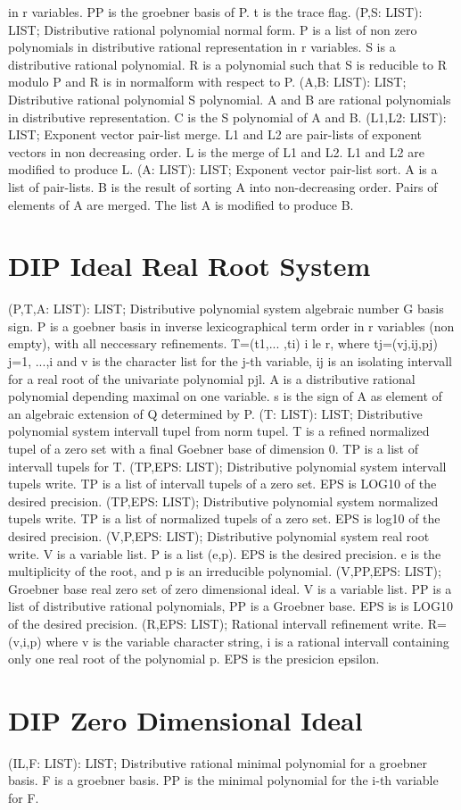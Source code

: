 in r variables. PP is the groebner basis of P. t is the
trace flag. \ecom 
{} (P,S: LIST): LIST; \eproc
\bcom Distributive rational polynomial normal form. P is a list
of non zero polynomials in distributive rational
representation in r variables. S is a distributive rational
polynomial. R is a polynomial such that S is reducible to R
modulo P and R is in normalform with respect to P.  \ecom 
{} (A,B: LIST): LIST; \eproc
\bcom Distributive rational polynomial S polynomial. A and B are
rational polynomials in distributive representation. C is
the S polynomial of A and B.  \ecom 
{} (L1,L2: LIST): LIST; \eproc
\bcom Exponent vector pair-list merge. L1 and L2 are pair-lists
of exponent vectors in non decreasing order.  L is the merge 
of L1 and L2. L1 and L2 are modified to produce L.  \ecom 
{} (A: LIST): LIST; \eproc
\bcom Exponent vector pair-list sort. A is a list of pair-lists. B is
the result of sorting A into non-decreasing order. Pairs of
elements of A are merged. The list A is modified to produce B.  \ecom 
\section{ DIP Ideal Real Root System  } 
 (P,T,A: LIST): LIST; \eproc
\bcom Distributive polynomial system algebraic number G basis sign.
P is a goebner basis in inverse lexicographical term order
in r variables (non empty), with all neccessary refinements.
T=(t1,... ,ti) i le r, where tj=(vj,ij,pj) j=1, ...,i and v is 
the character list for the j-th variable, ij is an isolating 
intervall for a real root of the univariate polynomial pjl.
A is a distributive rational polynomial depending maximal on one 
variable. s is the sign of A as element of an algebraic extension
of Q determined by P.  \ecom 
{} (T: LIST): LIST; \eproc
\bcom Distributive polynomial system intervall tupel from norm tupel.
T is a refined normalized tupel of a zero set with a final Goebner 
base of dimension 0. TP is a list of intervall tupels for T.  \ecom 
{} (TP,EPS: LIST); \eproc
\bcom Distributive polynomial system intervall tupels write. TP is a list
of intervall tupels of a zero set. EPS is LOG10 of the desired 
precision.  \ecom 
{} (TP,EPS: LIST); \eproc
\bcom Distributive polynomial system normalized tupels write.
TP is a list of normalized tupels of a zero set. EPS is log10 of 
the desired precision.  \ecom 
{} (V,P,EPS: LIST); \eproc
\bcom Distributive polynomial system real root write. V is a variable
list. P is a list (e,p). EPS is the desired precision. e is the 
multiplicity of the root, and p is an irreducible polynomial.  \ecom 
{} (V,PP,EPS: LIST); \eproc
\bcom Groebner base real zero set of zero dimensional ideal.
V is a variable list. PP is a list of distributive rational polynomials,
PP is a Groebner base. EPS is is LOG10 of the desired precision.  \ecom 
{} (R,EPS: LIST); \eproc
\bcom Rational intervall refinement write. R=(v,i,p) where v is the
variable character string, i is a rational intervall containing only
one real root of the polynomial p. EPS is the presicion epsilon.  \ecom 
\section{ DIP Zero Dimensional Ideal  } 
 (IL,F: LIST): LIST; \eproc
\bcom Distributive rational minimal polynomial for a groebner basis.
F is a groebner basis. PP is the minimal polynomial for the
i-th variable for F.  \ecom 
